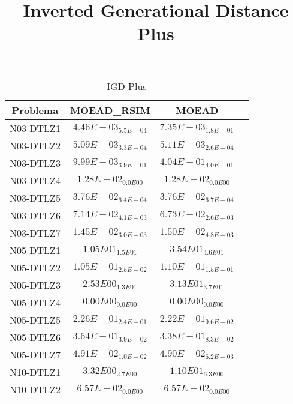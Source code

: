 \documentclass{article}
\title{Inverted Generational Distance Plus}
\author{}
\begin{document}
\maketitle
\begin{table*}[ht!]
\scriptsize
\caption{IGD Plus}
\centering\begin{tabular}{|c||c||c||c|} \hline
Problema &MOEAD_RSIM &MOEAD\\\hline
N03-DTLZ1 &\cellcolor{gray95}$4.46E-03_{5.5E-04}$ &\cellcolor{gray25}$7.35E-03_{1.8E-01}$\\ 
\hline
N03-DTLZ2 &\cellcolor{gray95}$5.09E-03_{3.3E-04}$ &\cellcolor{gray25}$5.11E-03_{2.6E-04}$\\ 
\hline
N03-DTLZ3 &\cellcolor{gray95}$9.99E-03_{3.9E-01}$ &\cellcolor{gray25}$4.04E-01_{4.0E-01}$\\ 
\hline
N03-DTLZ4 &\cellcolor{gray95}$1.28E-02_{0.0E00}$ &\cellcolor{gray25}$1.28E-02_{0.0E00}$\\ 
\hline
N03-DTLZ5 &\cellcolor{gray25}$3.76E-02_{6.4E-04}$ &\cellcolor{gray95}$3.76E-02_{6.7E-04}$\\ 
\hline
N03-DTLZ6 &\cellcolor{gray25}$7.14E-02_{4.1E-03}$ &\cellcolor{gray95}$6.73E-02_{2.6E-03}$\\ 
\hline
N03-DTLZ7 &\cellcolor{gray95}$1.45E-02_{3.0E-03}$ &\cellcolor{gray25}$1.50E-02_{4.8E-03}$\\ 
\hline
N05-DTLZ1 &\cellcolor{gray95}$1.05E01_{1.5E01}$ &\cellcolor{gray25}$3.54E01_{4.6E01}$\\ 
\hline
N05-DTLZ2 &\cellcolor{gray95}$1.05E-01_{2.5E-02}$ &\cellcolor{gray25}$1.10E-01_{1.5E-01}$\\ 
\hline
N05-DTLZ3 &\cellcolor{gray95}$2.53E00_{1.3E01}$ &\cellcolor{gray25}$3.13E01_{3.7E01}$\\ 
\hline
N05-DTLZ4 &\cellcolor{gray95}$0.00E00_{0.0E00}$ &\cellcolor{gray25}$0.00E00_{0.0E00}$\\ 
\hline
N05-DTLZ5 &\cellcolor{gray25}$2.26E-01_{2.4E-01}$ &\cellcolor{gray95}$2.22E-01_{9.6E-02}$\\ 
\hline
N05-DTLZ6 &\cellcolor{gray25}$3.64E-01_{3.9E-02}$ &\cellcolor{gray95}$3.38E-01_{8.3E-02}$\\ 
\hline
N05-DTLZ7 &\cellcolor{gray25}$4.91E-02_{1.0E-02}$ &\cellcolor{gray95}$4.90E-02_{6.2E-03}$\\ 
\hline
N10-DTLZ1 &\cellcolor{gray95}$3.32E00_{2.7E00}$ &\cellcolor{gray25}$1.10E01_{6.3E00}$\\ 
\hline
N10-DTLZ2 &\cellcolor{gray95}$6.57E-02_{0.0E00}$ &\cellcolor{gray25}$6.57E-02_{0.0E00}$\\ 

\end{tabular}
\end{table*}
\end{document}
